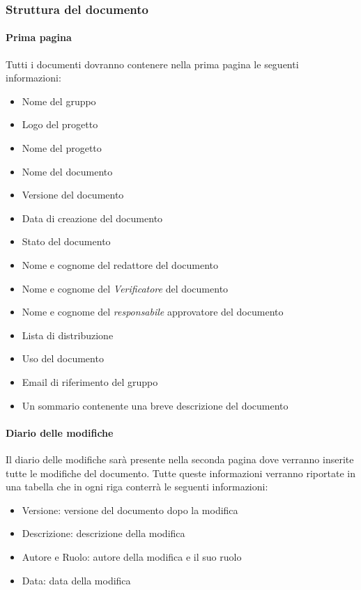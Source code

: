 \subsubsection{Struttura del documento}

\paragraph{Prima pagina }

Tutti i documenti dovranno contenere nella prima pagina le seguenti informazioni:
\begin{itemize}
\item Nome del gruppo
\item Logo del progetto
\item Nome del progetto
\item Nome del documento
\item Versione del documento
\item Data di creazione del documento
\item Stato del documento
\item Nome e cognome del redattore del documento
\item Nome e cognome del  \emph{Verificatore}  del documento
\item Nome e cognome del  \emph{responsabile}  approvatore del documento
\item Lista di distribuzione
\item Uso del documento
\item Email di riferimento del gruppo
\item Un sommario contenente una breve descrizione del documento
\end{itemize}


\paragraph{Diario delle modifiche }

Il diario delle modifiche sarà presente nella seconda pagina dove verranno inserite tutte le modifiche del documento. Tutte queste informazioni verranno riportate in una tabella che in ogni riga conterrà le seguenti informazioni:
\begin{itemize}
\item  Versione: versione del documento dopo la modifica
\item  Descrizione: descrizione della modifica
\item  Autore e Ruolo: autore della modifica e il suo ruolo
\item  Data: data della modifica
\end{itemize}
